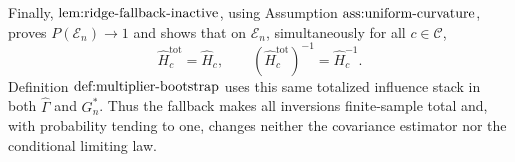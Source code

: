 Finally, \(\textnormal{lem:ridge-fallback-inactive}\), using Assumption \(\textnormal{ass:uniform-curvature}\), proves \(P(\mathcal E_n)\to1\) and shows that on \(\mathcal E_n\), simultaneously for all \(c\in\mathcal C\),
\[
 \widehat H_c^{\mathrm{tot}}=\widehat H_c,
 \qquad
 (\widehat H_c^{\mathrm{tot}})^{-1}=\widehat H_c^{-1}.
\]
Definition \(\textnormal{def:multiplier-bootstrap}\) uses this same totalized influence stack in both \(\widehat\Gamma\) and \(G_n^*\).  Thus the fallback makes all inversions finite-sample total and, with probability tending to one, changes neither the covariance estimator nor the conditional limiting law.
